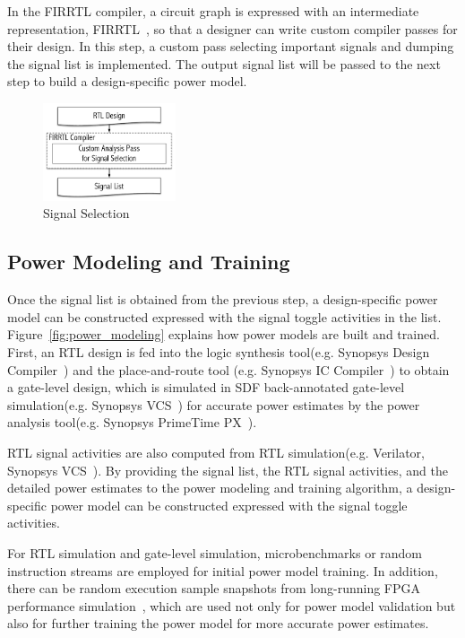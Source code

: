 In the FIRRTL compiler, a circuit graph is expressed with an intermediate representation,
FIRRTL~\cite{Li:EECS-2016-9}, so that a designer can write custom compiler passes for their
design. In this step, a custom pass selecting important signals and dumping the signal list
is implemented. The output signal list will be passed to the next step to build
a design-specific power model.

\begin{figure}[!ht]
	\centering
	\includegraphics[width=0.35\textwidth,height=\textheight,keepaspectratio]{images/signal_selection.pdf}
	\caption{Signal Selection}
	\label{fig:signal_selection}
\end{figure}

\subsection{Power Modeling and Training}
\label{sec:power_modeling}
Once the signal list is obtained from the previous step, a design-specific power model can be
constructed expressed with the signal toggle activities in the list. Figure~\ref{fig:power_modeling}
explains how power models are built and trained. First, an RTL design is fed into the logic
synthesis tool(e.g. Synopsys Design Compiler~\textregistered) and the place-and-route tool
(e.g. Synopsys IC Compiler~\textregistered) to obtain a gate-level design, which is simulated
in SDF back-annotated gate-level simulation(e.g. Synopsys VCS~\textregistered) for accurate power estimates
by the power analysis tool(e.g. Synopsys PrimeTime PX~\textregistered).

RTL signal activities are also computed from RTL simulation(e.g. Verilator, Synopsys VCS~\textregistered).
By providing the signal list, the RTL signal activities, and the detailed power estimates
to the power modeling and training algorithm, a design-specific power model can be constructed
expressed with the signal toggle activities.

For RTL simulation and gate-level simulation, microbenchmarks or random instruction streams are employed
for initial power model training. In addition, there can be random execution sample snapshots from
long-running FPGA performance simulation~\cite{Kim2016}, which are used not only for power model validation
but also for further training the power model for more accurate power estimates.

